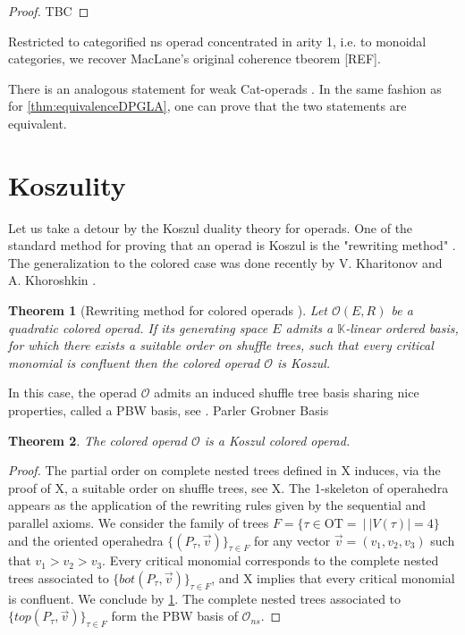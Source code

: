 \documentclass[10pt]{amsart}
\newtheorem{thm}{Theorem}[section]
\theoremstyle{definition}
\theoremstyle{remark}
\numberwithin{equation}{section}
\newcommand{\0}{\color{blue}{\mathsf{0}}}
\begin{document}
\begin{proof} TBC
\end{proof}

Restricted to categorified ns operad concentrated in arity 1, i.e. to monoidal categories, we recover MacLane's original coherence tbeorem [REF].

There is an analogous statement for weak Cat-operads \cite[Proposition 14.2]{DP15}. In the same fashion as for \cref{thm:equivalenceDPGLA}, one can prove that the two statements are equivalent. 

\section{Koszulity}

Let us take a detour by the Koszul duality theory for operads. One of the standard method for proving that an operad is Koszul is the "rewriting method" \cite[Section 8.3]{LodayVallette12}. The generalization to the colored case was done recently by V. Kharitonov and A. Khoroshkin \cite[Theorem 3.12]{KhariKhoro20}.

\begin{thm}[Rewriting method for colored operads {\cite[Theorem 8.3.1]{LodayVallette12}}] \label{thm:rewriting} Let $\mathcal{O}(E,R)$ be a quadratic colored operad. If its generating space $E$ admits a $\mathbb{K}$-linear ordered basis, for which there exists a suitable order on shuffle trees, such that every critical monomial is confluent then the colored operad $\mathcal{O}$ is Koszul. 
\end{thm}

In this case, the operad $\mathcal{O}$ admits an induced shuffle tree basis sharing nice properties, called a PBW basis, see \cite[Section 8.5.3]{LodayVallette12}. Parler Grobner Basis

\begin{thm} \label{thm:Koszulrewriting} The colored operad $\mathcal{O}$ is a Koszul colored operad. 
\end{thm}
\begin{proof} The partial order on complete nested trees defined in X induces, via the proof of X, a suitable order on shuffle trees, see X. The 1-skeleton of operahedra appears as the application of the rewriting rules given by the sequential and parallel axioms. We consider the family of trees $F=\{\tau \in \mathrm{OT}=\ | \ |V(\tau)|=4\}$ and the oriented operahedra $\{(P_\tau,\vec v)\}_{\tau \in F}$ for any vector $\vec v=(v_1,v_2,v_3)$ such that $v_1>v_2>v_3$. Every critical monomial corresponds to the complete nested trees associated to $\{bot(P_\tau,\vec v)\}_{\tau \in F}$, and X implies that every critical monomial is confluent. We conclude by \cref{thm:rewriting}. 
The complete nested trees associated to $\{top(P_\tau, \vec v)\}_{\tau \in F}$ form the PBW basis of $\mathcal{O}_{ns}$.
\end{proof}
\end{document}

